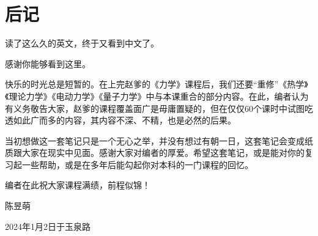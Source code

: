 \chapter{后记}

读了这么久的英文，终于又看到中文了。

感谢你能够看到这里。

快乐的时光总是短暂的。在上完赵爹的《力学》课程后，我们还要“重修”《热学》《理论力学》《电动力学》《量子力学》中与本课重合的部分内容。在此，编者认为有义务敬告大家，赵爹的课程覆盖面广是毋庸置疑的，但在仅仅60个课时中试图吃透如此广而多的内容，其内容不深、不精，也是必然的后果。

当初想做这一套笔记只是一个无心之举，并没有想过有朝一日，这套笔记会变成纸质跟大家在现实中见面。感谢大家对编者的厚爱。希望这套笔记，或是能对你的复习起一些帮助，或是在多年后能勾起你对本科的一门课程的回忆。

编者在此祝大家课程满绩，前程似锦！

\begin{flushright}
    陈昱萌

    2024年1月2日于玉泉路
\end{flushright}
